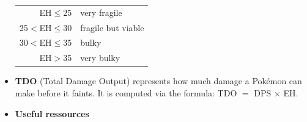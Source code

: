 \documentclass[8pt,aspectratio=169,compress]{beamer}
\renewcommand{\baselinestretch}{1.1}
\begin{document}
\begin{frame}
\begin{block}{}
\begin{tiny}
\begin{itemize}
\begin{center}
\begin{tabular}{rl}
EH$\leq$25   &  very fragile  \\
25$<$EH$\leq$30   &  fragile but viable  \\
30$<$EH$\leq$35   &  bulky  \\
EH$>$35   &  very bulky  \\
\end{tabular}
\end{center}
\item \textbf{TDO} (Total Damage Output) represents how much damage a Pok\'emon can make before it faints. It is computed via the formula: 
TDO $=$ DPS $\times$ EH.
\item \textbf{Useful ressources}

\begin{center}
   \href{https://pokemongo.gamepress.gg/}{} \quad \quad 
   \href{https://pokegocomplete.com}{} \quad \quad 
   \href{https://pokemongo.gamepress.gg/comprehensive-dps-spreadsheet}{}  \quad \quad 
   \href{https://www.pokebattler.com}{}
\end{center}
\end{itemize}

\end{tiny}
\end{block}
\end{frame}


\renewcommand{\baselinestretch}{1.1}
\end{document}
